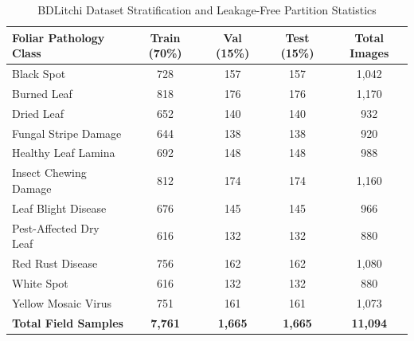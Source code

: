 \begin{table}[t]
\centering
\caption{BDLitchi Dataset Stratification and Leakage-Free Partition Statistics}
\label{tab:dataset}
\begin{tabular}{lcccc}
\toprule
\textbf{Foliar Pathology Class} & \textbf{Train (70\%)} & \textbf{Val (15\%)} & \textbf{Test (15\%)} & \textbf{Total Images} \\
\midrule
Black Spot & 728 & 157 & 157 & 1,042 \\
Burned Leaf & 818 & 176 & 176 & 1,170 \\
Dried Leaf & 652 & 140 & 140 & 932 \\
Fungal Stripe Damage & 644 & 138 & 138 & 920 \\
Healthy Leaf Lamina & 692 & 148 & 148 & 988 \\
Insect Chewing Damage & 812 & 174 & 174 & 1,160 \\
Leaf Blight Disease & 676 & 145 & 145 & 966 \\
Pest-Affected Dry Leaf & 616 & 132 & 132 & 880 \\
Red Rust Disease & 756 & 162 & 162 & 1,080 \\
White Spot & 616 & 132 & 132 & 880 \\
Yellow Mosaic Virus & 751 & 161 & 161 & 1,073 \\
\midrule
\textbf{Total Field Samples} & \textbf{7,761} & \textbf{1,665} & \textbf{1,665} & \textbf{11,094} \\
\bottomrule
\end{tabular}
\end{table}
